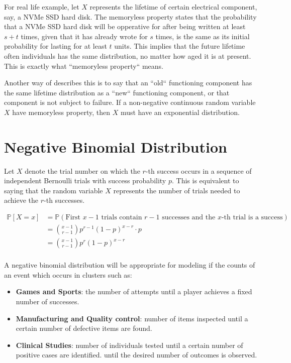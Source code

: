 For real life example, let $X$ represents 
the lifetime of certain electrical component, say, 
a NVMe SSD hard disk. The memoryless property states that the 
probability that a NVMe SSD hard disk will be opperative for after being written at least $s+t$ 
times, given that it has already wrote for $s$ times, is the same as its initial probability for lasting 
for at least $t$ units. This implies that the future lifetime often individuals has the same 
distribution, no matter how aged it is at present. This is exactly what 
``memoryless property`` means.

Another way of describes this is to say that an ``old`` functioning component has 
the same lifetime distribution as a ``new`` functioning component, or that 
component is not subject to failure. If a non-negative continuous 
random variable $X$ have memoryless property, then $X$ must have an exponential 
distribution.

\section{Negative Binomial Distribution}

Let $X$ denote the trial number on which the $r$-th success occurs 
in a sequence of independent Bernoulli trials with success probability $p$. 
This is equivalent to saying that the random variable $X$ represents 
the number of trials needed to achieve the $r$-th successes. 

\begin{align*}
    \mathbb{P}[X = x] &= \mathbb{P}(\text{First } x - 1 \text{ trials contain } r - 1 \text{ successes and the } x\text{-th trial is a success})\\
    &= { x - 1 \choose r - 1} p^{r-1} (1-p)^{x-r} \cdot p\\
    &= { x - 1 \choose r - 1} p^{r} (1-p)^{x-r}\\
\end{align*}

A negative binomial distribution will be appropriate for modeling 
if the counts of an event which occurs in clusters such as:
\begin{itemize}
    \item \textbf{Games and Sports}: the number of attempts until 
a player achieves a fixed number of successes.
    \item \textbf{Manufacturing and Quality control}: number of items inspected 
    until a certain number of defective items are found.
    \item \textbf{Clinical Studies}: number of individuals tested until a certain number of positive cases are identified.
    until the desired number of outcomes is observed. 
\end{itemize}

